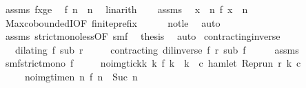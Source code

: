 \begin{isabellebody}
\ assms{\isacharparenleft}{}{\isacharparenright}\ fxge\ \isamarkupfalse%
\ {\isacartoucheopen}f\ n\ {\isacharless}\ n{\isacartoucheclose}\ \isamarkupfalse%
\ linarith\isanewline
\ \ \isamarkupfalse%
\ assms{\isacharparenleft}{}{\isacharparenright}\ \isamarkupfalse%
\ {\isacartoucheopen}{\isasymforall}x\ {\isachargreater}\ n\ f\ x\ {\isachargreater}\ n{\isacartoucheclose}\ \isamarkupfalse%
\ Max{\isachardot}coboundedI{\isacharbrackleft}OF\ finite{\isacharunderscore}prefix{\isacharbrackright}\isanewline
\ \ \ \ \isamarkupfalse%
\ not{\isacharunderscore}le\ \isamarkupfalse%
\ auto\isanewline
\ \ \isamarkupfalse%
\ assms{\isacharparenleft}{}{\isacharparenright}\ strict{\isacharunderscore}mono{\isacharunderscore}less{\isacharbrackleft}OF\ smf{\isacharbrackright}\ \isamarkupfalse%
\ {\isacharquery}thesis\ \isamarkupfalse%
\ auto\isanewline
{}\isamarkupfalse%
%
\endisatagproof
{\isafoldproof}%
%
\isadelimproof
\isanewline
%
\endisadelimproof
\isanewline
{}\isamarkupfalse%
\ contracting{\isacharunderscore}inverse{\isacharcolon}\isanewline
\ \ \ {\isacartoucheopen}dilating\ f\ sub\ r{\isacartoucheclose}\isanewline
\ \ \ \ \ {\isacartoucheopen}contracting\ {\isacharparenleft}dil{\isacharunderscore}inverse\ f{\isacharparenright}\ r\ sub\ f{\isacartoucheclose}\isanewline
%
\isadelimproof
%
\endisadelimproof
%
\isatagproof
{}\isamarkupfalse%
\ {\isacharminus}\isanewline
\ \ \isamarkupfalse%
\ assms\ \isamarkupfalse%
\ smf{\isacharcolon}{\isacartoucheopen}strict{\isacharunderscore}mono\ f{\isacartoucheclose}\isanewline
\ \ \ \ \ no{\isacharunderscore}img{\isacharunderscore}tick{\isacharcolon}{\isacartoucheopen}{\isasymforall}k{\isachardot}\ {\isacharparenleft}{\isasymnexists}k\ f\ k\ {\isacharequal}\ k{\isacharparenright}\ {\isasymlongrightarrow}\ {\isacharparenleft}{\isasymforall}c{\isachardot}\ {\isasymnot}{\isacharparenleft}hamlet\ {\isacharparenleft}{\isacharparenleft}Rep{\isacharunderscore}run\ r{\isacharparenright}\ k\ c{\isacharparenright}{\isacharparenright}{\isacharparenright}{\isacartoucheclose}\isanewline
\ \ \ \ \ no{\isacharunderscore}img{\isacharunderscore}time{\isacharcolon}{\isacartoucheopen}{\isasymAnd}n{\isachardot}\ {\isacharparenleft}{\isasymnexists}n\ f\ n\ {\isacharequal}\ {\isacharparenleft}Suc\ n{\isacharparenright}{\isacharparenright}\isanewline

\end{isabellebody}
